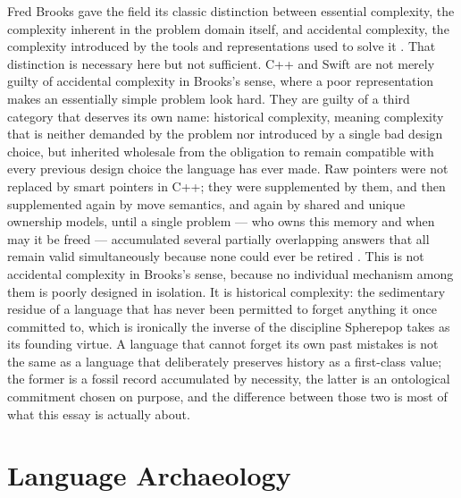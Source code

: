 \documentclass[11pt]{article}
\begin{document}
Fred Brooks gave the field its classic distinction between essential complexity, the complexity inherent in the problem domain itself, and accidental complexity, the complexity introduced by the tools and representations used to solve it \cite{brooks1987}. That distinction is necessary here but not sufficient. C++ and Swift are not merely guilty of accidental complexity in Brooks's sense, where a poor representation makes an essentially simple problem look hard. They are guilty of a third category that deserves its own name: historical complexity, meaning complexity that is neither demanded by the problem nor introduced by a single bad design choice, but inherited wholesale from the obligation to remain compatible with every previous design choice the language has ever made. Raw pointers were not replaced by smart pointers in C++; they were supplemented by them, and then supplemented again by move semantics, and again by shared and unique ownership models, until a single problem --- who owns this memory and when may it be freed --- accumulated several partially overlapping answers that all remain valid simultaneously because none could ever be retired \cite{iso14882}. This is not accidental complexity in Brooks's sense, because no individual mechanism among them is poorly designed in isolation. It is historical complexity: the sedimentary residue of a language that has never been permitted to forget anything it once committed to, which is ironically the inverse of the discipline Spherepop takes as its founding virtue. A language that cannot forget its own past mistakes is not the same as a language that deliberately preserves history as a first-class value; the former is a fossil record accumulated by necessity, the latter is an ontological commitment chosen on purpose, and the difference between those two is most of what this essay is actually about.

\section{Language Archaeology}
\end{document}
